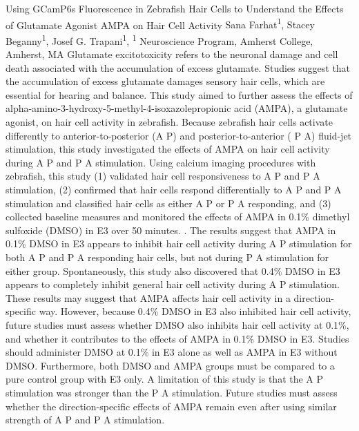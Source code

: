 
\makeabstract
{ %
Using GCamP6s Fluorescence in Zebrafish Hair Cells to Understand the Effects of Glutamate Agonist AMPA on Hair Cell Activity 
}
{ %
Sana Farhat\textsuperscript{1}, 
Stacey Beganny\textsuperscript{1}, 
Josef G. Trapani\textsuperscript{1}, 
}
{ %
\textsuperscript{1} Neuroscience Program, Amherst College, Amherst, MA 
}
{ %
Glutamate excitotoxicity refers to the neuronal damage and cell death associated with the accumulation of excess glutamate. Studies suggest that the accumulation of excess glutamate damages sensory hair cells, which are essential for hearing and balance. This study aimed to further assess the effects of alpha-amino-3-hydroxy-5-methyl-4-isoxazolepropionic acid (AMPA), a glutamate agonist, on hair cell activity in zebrafish. Because zebrafish hair cells activate differently to anterior-to-posterior (A \textrightarrow{} P) and posterior-to-anterior ( P \textrightarrow{} A) fluid-jet stimulation, this study investigated the effects of AMPA on hair cell activity during A \textrightarrow{} P and P \textrightarrow{} A stimulation. 
}
{ %
Using calcium imaging procedures with zebrafish, this study (1) validated hair cell responsiveness to A \textrightarrow{} P and P \textrightarrow{} A stimulation, (2) confirmed that hair cells respond differentially to A \textrightarrow{} P and P \textrightarrow{} A stimulation and classified hair cells as either A \textrightarrow{} P or P \textrightarrow{} A responding, and (3) collected baseline measures and monitored the effects of AMPA in 0.1\% dimethyl sulfoxide (DMSO) in E3 over 50 minutes. .
}
{ %
The results suggest that AMPA in 0.1\% DMSO in E3 appears to inhibit hair cell activity during A \textrightarrow{} P stimulation for both A \textrightarrow{} P and P \textrightarrow{} A responding hair cells, but not during P \textrightarrow{} A stimulation for either group. Spontaneously, this study also discovered that 0.4\% DMSO in E3 appears to completely inhibit general hair cell activity during A \textrightarrow{} P stimulation. 
}
{ %
These results may suggest that AMPA affects hair cell activity in a direction-specific way. However, because 0.4\% DMSO in E3 also inhibited hair cell activity, future studies must assess whether DMSO also inhibits hair cell activity at 0.1\%, and whether it contributes to the effects of AMPA in 0.1\% DMSO in E3. Studies should administer DMSO at 0.1\% in E3 alone as well as AMPA in E3 without DMSO. Furthermore, both DMSO and AMPA groups must be compared to a pure control group with E3 only. A limitation of this study is that the A \textrightarrow{} P stimulation was stronger than the P \textrightarrow{} A stimulation. Future studies must assess whether the direction-specific effects of AMPA remain even after using similar strength of A \textrightarrow{} P and P \textrightarrow{} A stimulation. 
}
 \newpage